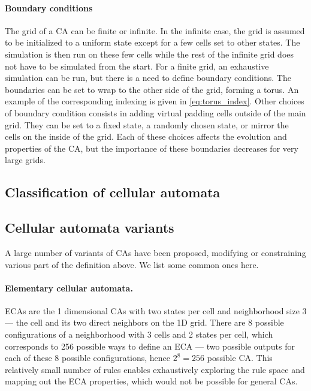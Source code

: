 \paragraph{Boundary conditions}
The grid of a \ac{CA} can be finite or infinite. In the infinite case, the grid
is assumed to be initialized to a uniform state except for a few cells set to
other states. The simulation is then run on these few cells while the rest of
the infinite grid does not have to be simulated from the start. For a finite
grid, an exhaustive simulation can be run, but there is a need to define
boundary conditions. The boundaries can be set to wrap to the other side of the
grid, forming a torus. An example of the corresponding indexing is given in
\eqref{eq:torus_index}. Other choices of boundary condition consists in adding
virtual padding cells outside of the main grid. They can be set to a fixed
state, a randomly chosen state, or mirror the cells on the inside of the grid.
Each of these choices affects the evolution and properties of the \ac{CA}, but
the importance of these boundaries decreases for very large grids.

\subsection{Classification of cellular automata}

\subsection{Cellular automata variants}

A large number of variants of \acp{CA} have been proposed, modifying or
constraining various part of the definition above. We list some common ones
here.

\paragraph{Elementary cellular automata.\label{sec:elem-cell-autom}}
\Acp{ECA} are the 1 dimensional \acp{CA} with two states per cell and
neighborhood size 3 --- the cell and its two direct neighbors on the 1D grid.
There are 8 possible configurations of a neighborhood with 3 cells and 2 states
per cell, which corresponds to 256 possible ways to define an \ac{ECA} --- two
possible outputs for each of these 8 possible configurations, hence
$2^{8} = 256$ possible \ac{CA}. This relatively small number of rules enables
exhaustively exploring the rule space and mapping out the \ac{ECA} properties,
which would not be possible for general \acp{CA}.

